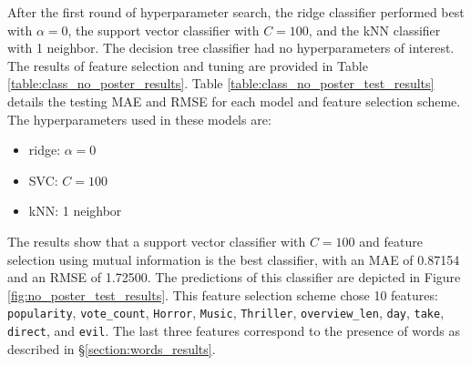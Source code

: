\documentclass[12pt, oneside]{article}   	%
\begin{document}
After the first round of hyperparameter search, the ridge classifier performed best with $\alpha=0$, the support vector classifier with $C=100$, and the kNN classifier with 1 neighbor. The decision tree classifier had no hyperparameters of interest. The results of feature selection and tuning are provided in Table \ref{table:class_no_poster_results}. Table \ref{table:class_no_poster_test_results} details the testing MAE and RMSE for each model and feature selection scheme. The hyperparameters used in these models are:
\begin{itemize}
\item ridge: $\alpha=0$
\item SVC: $C=100$
\item kNN: 1 neighbor
\end{itemize}
The results show that a support vector classifier with $C=100$ and feature selection using mutual information is the best classifier, with an MAE of 0.87154 and an RMSE of 1.72500. The predictions of this classifier are depicted in Figure \ref{fig:no_poster_test_results}. This feature selection scheme chose 10 features: \texttt{popularity}, \texttt{vote\_count}, \texttt{Horror}, \texttt{Music}, \texttt{Thriller}, \texttt{overview\_len}, \texttt{day}, \texttt{take}, \texttt{direct}, and \texttt{evil}. The last three features correspond to the presence of words as described in \S \ref{section:words_results}.

\begin{table}
\caption{\label{table:class_no_poster_results}Results of feature selection and hyperparameter tuning without posters.}
\end{table}
\end{document}
